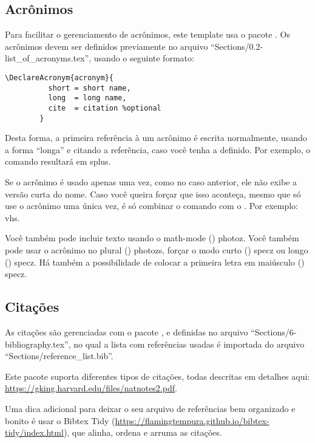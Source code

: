     \subsection{Acrônimos}
      Para facilitar o gerenciamento de acrônimos, este template usa o pacote . Os acrônimos devem ser definidos previamente no arquivo ``Sections/0.2-list\_of\_acronyms.tex'', usando o seguinte formato:
      \begin{lstlisting}[autogobble]
        \DeclareAcronym{acronym}{
          short = short name,
          long  = long name,
          cite  = citation %optional
        }
      \end{lstlisting}

      Desta forma, a primeira referência à um acrônimo é escrita normalmente, usando a forma ``longa'' e citando a referência, caso você tenha a definido. Por exemplo, o comando  resultará em \ac{splus}.

      Se o acrônimo é usado apenas uma vez, como no caso anterior, ele não exibe a versão curta do nome. Caso você queira forçar que isso aconteça, mesmo que só use o acrônimo uma única vez, é só combinar o comando  com o . Por exemplo: \ac{vhs}.

      Você também pode incluir texto usando o math-mode () \ac{photoz}. Você também pode usar o acrônimo no plural () \acp{photoz}, forçar o modo curto () \acs{specz} ou longo () \acl{specz}. Há também a possibilidade de colocar a primeira letra em maiúsculo () \Ac{specz}.

    \subsection{Citações}
      As citações são gerenciadas com o pacote , e definidas no arquivo ``Sections/6-bibliography.tex'', no qual a lista com referências usadas é importada do arquivo ``Sections/reference\_list.bib''. 

      Este pacote suporta diferentes tipos de citações, todas descritas em detalhes aqui: \url{https://gking.harvard.edu/files/natnotes2.pdf}.

      Uma dica adicional para deixar o seu arquivo de referências bem organizado e bonito é usar o Bibtex Tidy (\url{https://flamingtempura.github.io/bibtex-tidy/index.html}), que alinha, ordena e arruma as citações.

